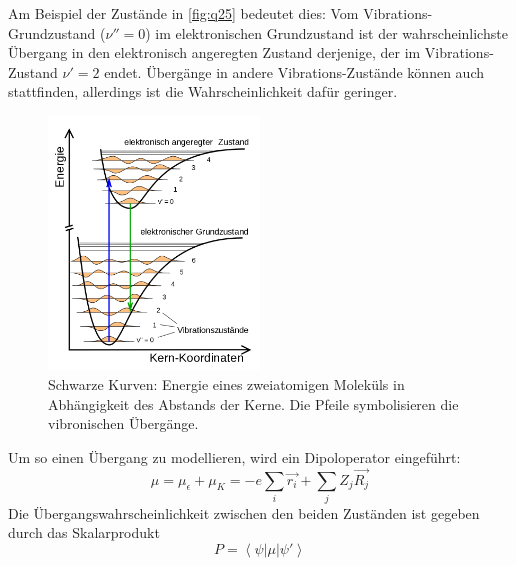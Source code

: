 Am Beispiel der Zustände in \autoref{fig:q25} bedeutet dies: Vom Vibrations-Grundzustand ($\nu'' = 0$) im elektronischen Grundzustand ist der wahrscheinlichste Übergang in den elektronisch angeregten Zustand derjenige, der im Vibrations-Zustand $\nu' = 2$ endet. Übergänge in andere Vibrations-Zustände können auch stattfinden, allerdings ist die Wahrscheinlichkeit dafür geringer.


\begin{figure}[H]
    \centering
    \includegraphics[width = 0.5\textwidth]{resources/09-05-2012/Franck-Condon-Prinzip}
    \caption{Schwarze Kurven: Energie eines zweiatomigen Moleküls in Abhängigkeit des Abstands der Kerne. Die Pfeile symbolisieren die vibronischen Übergänge.}
    \label{fig:q25}
\end{figure}


Um so einen Übergang zu modellieren, wird ein Dipoloperator eingeführt:
\begin{equation}
    \mu = \mu_{\epsilon} + \mu_K = - e \sum_{i} \vec{r_i}  + \sum_{j} Z_j \vec{R_j} 
\end{equation}
Die Übergangswahrscheinlichkeit zwischen den beiden Zuständen ist gegeben durch das Skalarprodukt
\begin{equation}
    P = \left\langle\psi| \mu | \psi' \right\rangle   
\end{equation}

